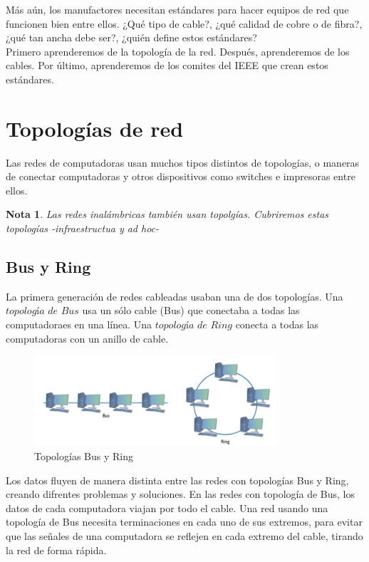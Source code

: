 \documentclass[12pt]{report}
\newtheorem{nota}{Nota}
\begin{document}
Más aún, los manufactores necesitan estándares para hacer equipos de red que funcionen
bien entre ellos. ¿Qué tipo de cable?, ¿qué calidad de cobre o de fibra?, ¿qué tan ancha
debe ser?, ¿quién define estos estándares?\\
Primero aprenderemos de la topología de la red. Después, aprenderemos de los cables. 
Por último, aprenderemos de los comites del IEEE que crean estos estándares.

\section{Topologías de red}
Las redes de computadoras usan muchos tipos distintos de topologías, o maneras de conectar 
computadoras y otros dispositivos como switches e impresoras entre ellos.
\begin{nota}
  Las redes inalámbricas también usan topolgías. Cubriremos estas topologías -infraestructua y ad hoc-
\end{nota}

\subsection{Bus y Ring}
La primera generación de redes cableadas usaban una de dos topologías. Una 
$\textit{topología de Bus}$ usa un sólo cable (Bus) que conectaba a todas las computadoraes en una
línea. Una $\textit{topología de Ring}$ conecta a todas las computadoras con un anillo de cable.

\begin{figure}[h]
\centering
\includegraphics[width=0.8\textwidth]{Bus-Ring.jpg}
\caption{Topologías Bus y Ring}
\end{figure}

Los datos fluyen de manera distinta entre las redes con topologías Bus y Ring, creando 
difrentes problemas y soluciones. En las redes con topología de Bus, los datos de cada 
computadora viajan por todo el cable. Una red usando una topología de Bus necesita 
terminaciones en cada uno de sus extremos, para evitar que las señales de una computadora
se reflejen en cada extremo del cable, tirando la red de forma rápida.\\
\end{document}
